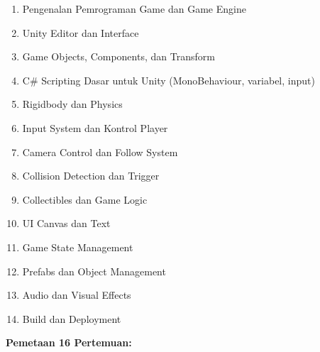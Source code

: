 \documentclass[12pt,a4paper]{article}
\begin{document}
\begin{enumerate}[leftmargin=*]
  \item Pengenalan Pemrograman Game dan Game Engine
  \item Unity Editor dan Interface
  \item Game Objects, Components, dan Transform
  \item C\# Scripting Dasar untuk Unity (MonoBehaviour, variabel, input)
  \item Rigidbody dan Physics
  \item Input System dan Kontrol Player
  \item Camera Control dan Follow System
  \item Collision Detection dan Trigger
  \item Collectibles dan Game Logic
  \item UI Canvas dan Text
  \item Game State Management
  \item Prefabs dan Object Management
  \item Audio dan Visual Effects
  \item Build dan Deployment
\end{enumerate}

\textbf{Pemetaan 16 Pertemuan:}
\end{document}
